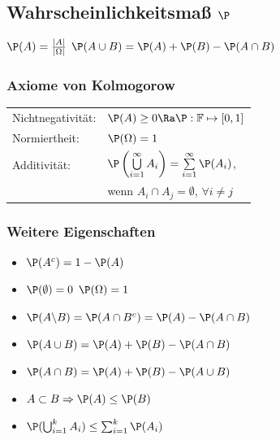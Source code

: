 \documentclass[german,color,6pt]{latex4ei/latex4ei_sheet}
\begin{document}
\begin{sectionbox}
	\subsection{Wahrscheinlichkeitsmaß $\P$}
	$\P(A) = \frac{|A|}{|\Omega|}$ \hfill $\P(A \cup B) = \P(A) + \P(B) - \P(A \cap B)$\\
	\subsubsection{Axiome von Kolmogorow}
	\begin{tabular}{ll}
		Nichtnegativität: & $\P(A) \geq 0 \Ra \P:\mathbb F \mapsto [0,1]$ \\
		Normiertheit: & $\P(\Omega) = 1$ \\
		Additivität: & $\P\left(\bigcup\limits_{i=1}^{\infty} A_i \right) = \sum\limits_{i=1}^{\infty} \P(A_i)$, \\
		& wenn $A_i \cap A_j = \emptyset$, $\forall i \neq j$ \\
	\end{tabular}
	\subsubsection{Weitere Eigenschaften}
	\begin{itemize}
		\item 	$\P(A^c) = 1 - \P(A)$
		\item 	$\P(\emptyset) = 0$ \qquad $\P(\Omega)=1$
		\item 	$\P(A \backslash B) = \P(A \cap B^c) = \P(A) - \P(A \cap B)$
		\item 	$\P(A \cup B) = \P(A) + \P (B) - \P(A \cap B)$
		\item 	$\P(A \cap B) = \P(A) + \P (B) - \P(A \cup B)$
		\item 	$A \subset B \Rightarrow \P(A) \leq \P(B)$
		\item 	$\P(\bigcup_{i=1}^k A_i) \leq \sum_{i=1}^k \P(A_i)$
	\end{itemize}


\end{sectionbox}
\vfill

\end{document}
